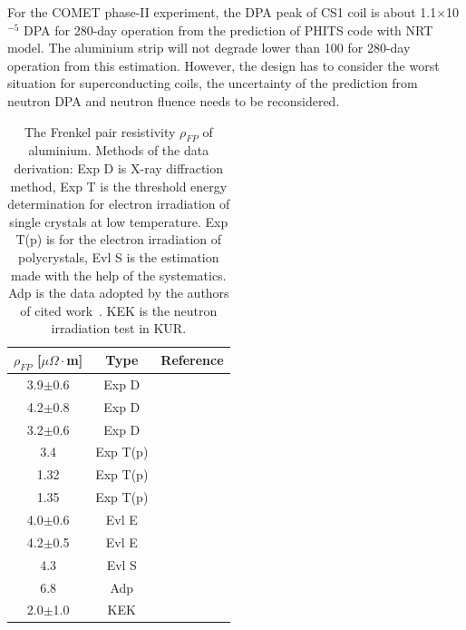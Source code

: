 For the COMET phase-II experiment, the DPA peak of CS1 coil is about 1.1$\times$10$^{-5}$ DPA for 280-day operation from the prediction of PHITS code with NRT model.
The aluminium strip will not degrade lower than 100 for 280-day operation from this estimation.
However, the design has to consider the worst situation for superconducting coils, the uncertainty of the prediction from neutron DPA and neutron fluence needs to be reconsidered.
\begin{table}[H]
 \centering
 \begin{tabular}{ccc} \hline \hline
  $\rho_{FP}$ [$\mu\Omega\cdot$m] & Type & Reference \\ \hline
  3.9$\pm$0.6 & Exp D & \cite{erh1} \\
  4.2$\pm$0.8 & Exp D & \cite{erh2} \\
  3.2$\pm$0.6 & Exp D & \cite{rober} \\
  3.4 & Exp T(p) & \cite{ref1} \\
  1.32 & Exp T(p) & \cite{ref2} \\
  1.35 & Exp T(p) & \cite{ref3} \\
  4.0$\pm$0.6 & Evl E & \cite{ref4} \\
  4.2$\pm$0.5 & Evl E & \cite{ref5} \\
  4.3 & Evl S & \cite{ref6} \\ 
  6.8 & Adp & \cite{horak} \\
  2.0$\pm$1.0 & KEK & \\ \hline \hline
 \end{tabular}
 \caption{The Frenkel pair resistivity $\rho_{FP}$ of aluminium. Methods of the data derivation: Exp D is X-ray diffraction method, Exp T is the threshold energy determination for electron irradiation of single crystals at low temperature. Exp T(p) is for the electron irradiation of polycrystals, Evl S is the estimation made with the help of the systematics. Adp is the data adopted by the authors of cited work~\cite{yu}. KEK is the neutron irradiation test in KUR.}
 \label{frank}
\end{table}
